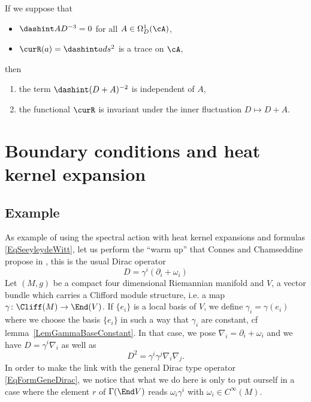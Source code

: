 \begin{proposition}
	If we suppose that
	\begin{itemize}
		\item $\dashint AD^{-3}=0$ for all $A\in\Omega^1_D(\cA)$,
		\item $\curR(a)=\dashint ads^2$ is a trace on $\cA$,
	\end{itemize}
	then
	\begin{enumerate}
		\item the term $\dashint (D+A)^{-2}$ is independent of $A$,
		\item the functional $\curR$ is invariant under the inner fluctuation $D\mapsto D+A$.
	\end{enumerate}
\end{proposition}



\section{Boundary conditions and heat kernel expansion}			\label{SecGravBoundCC}

\subsection{Example}

As example of using the spectral action with heat kernel expansions and formulas \eqref{EqSeeyleydeWitt}, let us perform the ``warm up'' that Connes and Chamseddine propose in \cite{QGBoundaryTermsSpectralAction}, this is the usual Dirac operator
\begin{equation}		\label{EqFormgenDiracD}
	D=\gamma^i(\partial_i+\omega_i)
\end{equation}
Let $(M,g)$ be a compact four dimensional Riemannian manifold and $V$, a vector bundle which carries a Clifford module structure, i.e. a map $\gamma\colon \Cliff(M)\to \End(V)$. If $\{ e_i \}$ is a local basis of $V$, we define $\gamma_i=\gamma(e_i)$ where we choose the basis $\{ e_i \}$ in such a way that $\gamma_i$ are constant, cf lemma~\ref{LemGammaBaseConstant}. In that case, we pose $\nabla_i=\partial_i+\omega_i$ and we have $D=\gamma^i\nabla_i$ as well as
\[
	D^2=\gamma^i\gamma^j\nabla_i\nabla_j.
\]
In order to make the link with the general Dirac type operator \eqref{EqFormGeneDirac}, we notice that what we do here is only to put ourself in a case where the element $r$ of $\Gamma(\End V)$ reads $\omega_i\gamma^i$ with $\omega_i\in C^{\infty}(M)$.

